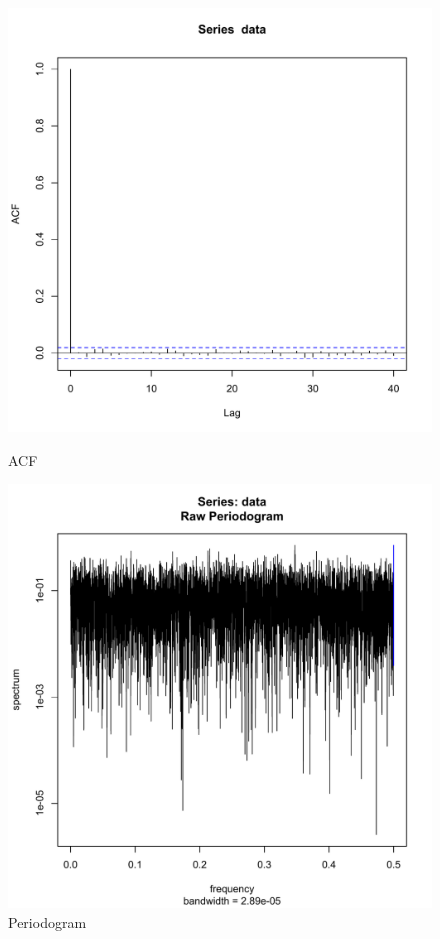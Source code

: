 \documentclass[11pt]{article}
\begin{document}
\begin{figure}[ht]
\begin{minipage}[b]{0.45\linewidth}
\centering
\includegraphics[scale=.42]{b4564acf.pdf}
\caption{ACF}
\label{fig:figure7}
\end{minipage}
\begin{minipage}[b]{0.45\linewidth}
\centering
\includegraphics[scale=.42]{b4564pgram.pdf}
\caption{Periodogram}
\label{fig:figure8}
\end{minipage}
\end{figure}
\end{document}
